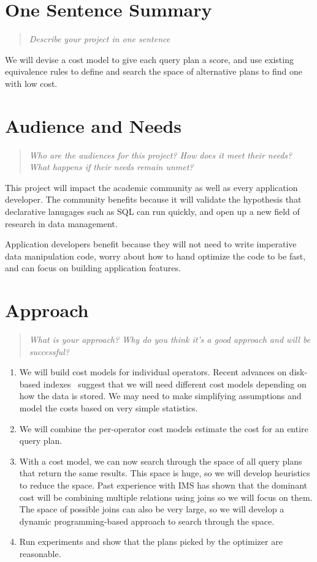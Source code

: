 \documentclass{proc}
\begin{document}
\section{One Sentence Summary}
\begin{quote}
\emph{Describe your project in one sentence}
\end{quote}

We will devise a cost model to give each query plan a score, and use existing equivalence rules to define and search the space of alternative plans to find one with low cost.

\section{Audience and Needs}
\begin{quote}
\emph{Who are the audiences for this project? 
How does it meet their needs? 
What happens if their needs remain unmet?}
\end{quote}

This project will impact the academic community as well as every application developer.
The community benefits because it will validate the hypothesis that declarative lanugages such as SQL can run quickly, and open up a new field of research in data management.

Application developers benefit because they will not need to write imperative data manipulation code, worry about how to hand optimize the code to be fast, and can focus on building application features.

\section{Approach}
\begin{quote}
\emph{What is your approach?
Why do you think it's a good approach and will be successful?}
\end{quote}

\begin{enumerate}
\item We will build cost models for individual operators.  Recent advances on disk-based indexes~\cite{bayer2002organization} suggest that we will need different cost models depending on how the data is stored.  We may need to make simplifying assumptions and model the costs based on very simple statistics.
\item We will combine the per-operator cost models estimate the cost for an entire query plan.
\item With a cost model, we can now search through the space of all query plans that return the same results.  This space is huge, so we will develop heuristics to reduce the space.   Past experience with IMS has shown that the dominant cost will be combining multiple relations using joins so we will focus on them. The space of possible joins can also be very large, so we will develop a dynamic programming-based approach to search through the space.
\item Run experiments and show that the plans picked by the optimizer are reasonable.
\end{enumerate}
\end{document}
